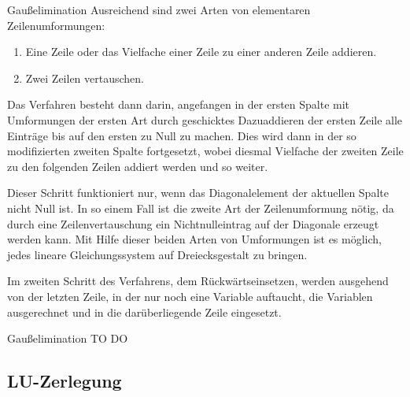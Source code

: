 \begin{algo}{Gaußelimination}
    Ausreichend sind zwei Arten von elementaren Zeilenumformungen:
    \begin{enumerate}
        \item Eine Zeile oder das Vielfache einer Zeile zu einer anderen Zeile addieren.
        \item Zwei Zeilen vertauschen.
    \end{enumerate}

    Das Verfahren besteht dann darin, angefangen in der ersten Spalte mit Umformungen der ersten Art durch geschicktes Dazuaddieren der ersten Zeile alle Einträge bis auf den ersten zu Null zu machen.
    Dies wird dann in der so modifizierten zweiten Spalte fortgesetzt, wobei diesmal Vielfache der zweiten Zeile zu den folgenden Zeilen addiert werden und so weiter.

    Dieser Schritt funktioniert nur, wenn das Diagonalelement der aktuellen Spalte nicht Null ist.
    In so einem Fall ist die zweite Art der Zeilenumformung nötig, da durch eine Zeilenvertauschung ein Nichtnulleintrag auf der Diagonale erzeugt werden kann.
    Mit Hilfe dieser beiden Arten von Umformungen ist es möglich, jedes lineare Gleichungssystem auf Dreiecksgestalt zu bringen.

    Im zweiten Schritt des Verfahrens, dem Rückwärtseinsetzen, werden ausgehend von der letzten Zeile, in der nur noch eine Variable auftaucht, die Variablen ausgerechnet und in die darüberliegende Zeile eingesetzt.
\end{algo}

\begin{example}{Gaußelimination}
    TO DO
\end{example}

\subsection{LU-Zerlegung}


